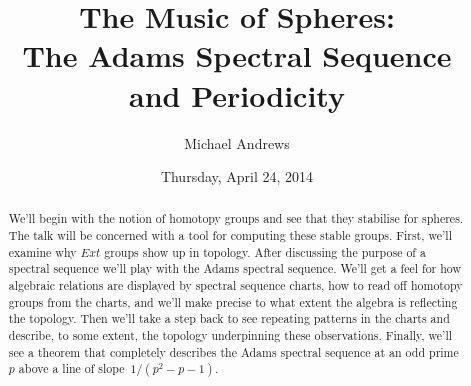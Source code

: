 \documentclass{UAmathtalk}
\author{Michael Andrews}
\title{The Music of Spheres:\\ The Adams Spectral Sequence\\ and Periodicity}
\date{Thursday, April 24, 2014}
\begin{document}
\maketitle

\begin{abstract}
We'll begin with the notion of homotopy groups and see that they stabilise for spheres.
The talk will be concerned with a tool for computing these stable groups.
First, we'll examine why $Ext$ groups show up in topology.
After discussing the purpose of a spectral sequence we'll play with the Adams spectral sequence.
We'll get a feel for how algebraic relations are displayed by spectral sequence charts, how to read off homotopy groups from the charts, and we'll make precise to what extent the algebra is reflecting the topology. 
Then we'll take a step back to see repeating patterns in the charts and describe, to some extent, the topology underpinning these observations.
Finally, we'll see a theorem that completely describes the Adams spectral sequence at an odd prime~$p$ above a line of slope~$1/(p^2-p-1)$.
\end{abstract}
\end{document}
